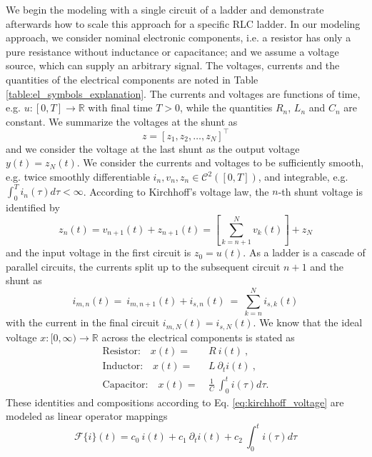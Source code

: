 We begin the modeling with a single circuit of a ladder and demonstrate afterwards how to scale this approach for a specific RLC ladder. In our modeling approach, we consider nominal electronic components, i.e. a resistor has only a pure resistance without inductance or capacitance; and we assume a voltage source, which can supply an arbitrary signal. The voltages, currents and the quantities of the electrical components are noted in Table \ref{table:el_symbols_explanation}. The currents and voltages are functions of time, e.g. $u: [0,T] \rightarrow\mathbb{R}$ with final time $T>0$, while the quantities 	$R_{n}$, $L_{n}$ and $C_{n}$ are constant. We summarize the voltages at the shunt as 
\begin{equation}
	z = \left[z_{1}, z_{2}, \ldots, z_{N}\right]^{\top} \label{eq:z_voltages_shunt}
\end{equation}	
and we consider the voltage at the last shunt as the output voltage $y(t) = z_{N}(t)$. We consider the currents and voltages to be sufficiently smooth, e.g. twice smoothly differentiable $i_{n}, v_{n}, z_{n} \in \mathcal{C}^{2}([0,T])$, and integrable, e.g. $\int_{0}^{T} i_{n}(\tau) d\tau < \infty$. According to Kirchhoff's voltage law, the $n$-th shunt voltage is identified by
\begin{equation}
	z_{n}(t) = v_{n+1}(t) + z_{n+1}(t) = \left[\sum_{k=n+1}^{N} v_{k}(t)\right] + z_{N} \label{eq:kirchhoff_voltage}
\end{equation}
and the input voltage in the first circuit is $z_{0} = u(t)$. As a ladder is a cascade of parallel circuits, the currents split up to the subsequent circuit $n+1$ and the shunt as
\begin{equation}
	i_{m,n}(t) =~ i_{m,n+1}(t) + i_{s,n}(t) ~=~ \sum_{k=n}^{N} i_{s,k}(t) \label{eq:kirchhoff_current}
\end{equation}
with the current in the final circuit $i_{m,N}(t) = i_{s,N}(t)$. We know that the ideal voltage $x:[0,\infty) \rightarrow \mathbb{R}$ across the electrical components is stated as 
\begin{align*}
	\text{Resistor:} \quad x(t) =&~ R ~ i(t) ~\text{,}\\
	\text{Inductor:} \quad x(t) =&~ L ~ \partial_{t} i(t) ~\text{,}\\
	\text{Capacitor:} \quad x(t) =&~ \frac{1}{C} ~ \int_{0}^{t} i(\tau) d\tau \text{.}
\end{align*}
These identities and compositions according to Eq. \eqref{eq:kirchhoff_voltage} are modeled as linear operator mappings 
\begin{equation*}
	\mathcal{F}\{i\}(t) = c_{0} ~ i(t) +  c_{1}~ \partial_{t} i(t) +  c_{2}~ \int_{0}^{t} i(\tau) d\tau 
\end{equation*}
